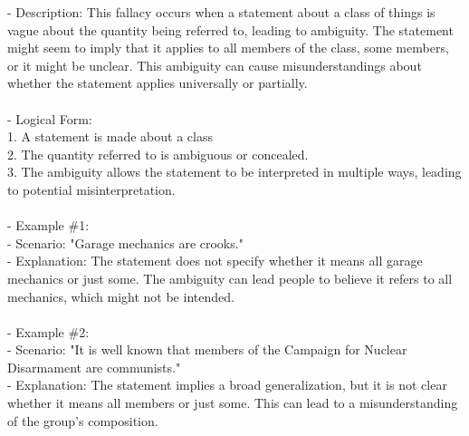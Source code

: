 \documentclass[a4paper,12pt,single,pdftex]{scrartcl}
\begin{document}
      - Description: This fallacy occurs when a statement about a class of things is vague about the quantity being referred to, leading to ambiguity. The statement might seem to imply that it applies to all members of the class, some members, or it might be unclear. This ambiguity can cause misunderstandings about whether the statement applies universally or partially.
    \\

    
      
    \\

    
      - Logical Form: 
    \\

    
        1. A statement is made about a class
    \\

    
        2. The quantity referred to is ambiguous or concealed.
    \\

    
        3. The ambiguity allows the statement to be interpreted in multiple ways, leading to potential misinterpretation.
    \\

    
      
    \\

    
      - Example \#1:
    \\

    
        - Scenario: "Garage mechanics are crooks."
    \\

    
        - Explanation: The statement does not specify whether it means all garage mechanics or just some. The ambiguity can lead people to believe it refers to all mechanics, which might not be intended.
    \\

    
      
    \\

    
      - Example \#2:
    \\

    
        - Scenario: "It is well known that members of the Campaign for Nuclear Disarmament are communists."
    \\

    
        - Explanation: The statement implies a broad generalization, but it is not clear whether it means all members or just some. This can lead to a misunderstanding of the group's composition.
    \\
\end{document}
